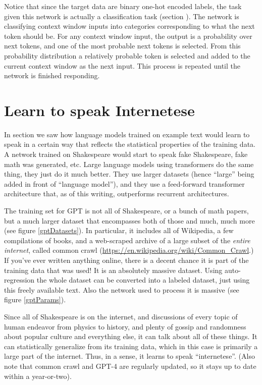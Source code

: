 Notice that since the target data are binary one-hot encoded labels, the task given this network is actually a classification task (section ). The network is classifying context window inputs into categories corresponding to what the next token should be.  For any context window input, the output is a probability over next tokens, and one of the most probable next tokens is selected. From this probability distribution a relatively probable token is selected and added to the current context window as the next input. This process is repeated until the network is finished responding.

\section{Learn to speak Internetese}

In section  we saw how language models trained on example text would learn to speak in a certain way that reflects the statistical properties of the training data. A network trained on Shakespeare would start to speak fake Shakespeare, fake math was generated, etc. 
Large language models using transformers do the same thing, they just do it much better. They use larger datasets (hence ``large'' being added in front of ``language model''), and they use a feed-forward transformer architecture that, as of this writing, outperforms recurrent architectures. 

The training set for GPT is not all of Shakespeare, or a bunch of math papers, but a much larger dataset that encompasses both of those and much, much more (see figure \ref{gptDatasets}).  In particular, it includes all of Wikipedia, a few compilations of books, and a web-scraped archive of a large subset of the \emph{entire internet}, called common crawl (\url{https://en.wikipedia.org/wiki/Common_Crawl}.) If you've ever written anything online, there is a decent chance it is part of the training data that was used! It is an absolutely massive dataset. Using auto-regression the whole dataset can be converted into a labeled dataset, just using this freely available text.  Also the network used to process it is massive (see figure \ref{gptParams}). 

Since all of Shakespeare is on the internet, and discussions of every topic of human endeavor from physics to history, and plenty of gossip and randomness about popular culture and everything else, it can talk about all of these things.  It can statistically generalize from its training data, which in this case is primarily a large part of the internet. Thus, in a sense, it learns to speak ``internetese''.  (Also note that common crawl and GPT-4 are regularly updated, so it stays up to date within a year-or-two). 

